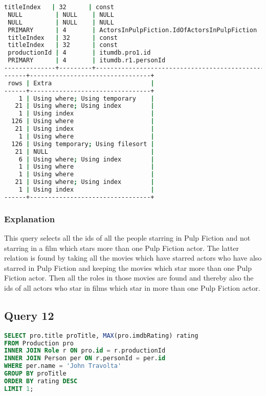 \begin{lstlisting}[language=bash]
 titleIndex   | 32      | const                                              |
 NULL         | NULL    | NULL                                               |
 NULL         | NULL    | NULL                                               |
 PRIMARY      | 4       | ActorsInPulpFiction.IdOfActorsInPulpFiction        |
 titleIndex   | 32      | const                                              |
 titleIndex   | 32      | const                                              |
 productionId | 4       | itumdb.pro1.id                                     |
 PRIMARY      | 4       | itumdb.r1.personId                                 |
--------------+---------+----------------------------------------------------+
------+---------------------------------+
 rows | Extra                           |
------+---------------------------------+
    1 | Using where; Using temporary    |
   21 | Using where; Using index        |
    1 | Using index                     |
  126 | Using where                     |
   21 | Using index                     |
    1 | Using where                     |
  126 | Using temporary; Using filesort |
   21 | NULL                            |
    6 | Using where; Using index        |
    1 | Using where                     |
    1 | Using where                     |
   21 | Using where; Using index        |
    1 | Using index                     |
------+---------------------------------+

\end{lstlisting}

\subsubsection{Explanation}
This query selects all the ids of all the people starring in Pulp Fiction and not starring in a film which stars more than one Pulp Fiction actor. The latter relation is found by taking all the movies which have starred actors who have also starred in Pulp Fiction and keeping the movies which star more than one Pulp Fiction actor. Then all the roles in those movies are found and thereby also the ids of all actors who star in films which star in more than one Pulp Fiction actor.


\bigskip
\subsection{Query 12}
\begin{lstlisting}[language=sql]
SELECT pro.title proTitle, MAX(pro.imdbRating) rating
FROM Production pro
INNER JOIN Role r ON pro.id = r.productionId
INNER JOIN Person per ON r.personId = per.id
WHERE per.name = 'John Travolta'
GROUP BY proTitle
ORDER BY rating DESC
LIMIT 1;
\end{lstlisting}

